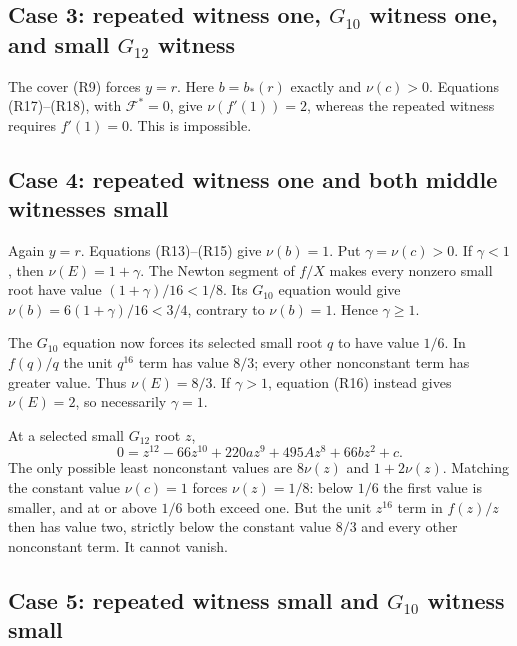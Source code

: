 \documentclass[
  british,
  10pt,
  a4paper,
]{article}
\begin{document}
\subsection{\texorpdfstring{Case 3: repeated witness one, \(G_{10}\)
witness one, and small \(G_{12}\)
witness}{Case 3: repeated witness one, G\_\{10\} witness one, and small G\_\{12\} witness}}\label{case-3-repeated-witness-one-g_10-witness-one-and-small-g_12-witness}

The cover (R9) forces \(y=r\). Here \(b=b_*(r)\) exactly and
\(\nu(c)>0\). Equations (R17)--(R18), with \(\mathcal F^*=0\), give
\(\nu(f'(1))=2\), whereas the repeated witness requires \(f'(1)=0\).
This is impossible.

\subsection{Case 4: repeated witness one and both middle witnesses
small}\label{case-4-repeated-witness-one-and-both-middle-witnesses-small}

Again \(y=r\). Equations (R13)--(R15) give \(\nu(b)=1\). Put
\(\gamma=\nu(c)>0\). If \(\gamma<1\), then \(\nu(E)=1+\gamma\). The
Newton segment of \(f/X\) makes every nonzero small root have value
\((1+\gamma)/16<1/8\). Its \(G_{10}\) equation would give
\(\nu(b)=6(1+\gamma)/16<3/4\), contrary to \(\nu(b)=1\). Hence
\(\gamma\geq1\).

The \(G_{10}\) equation now forces its selected small root \(q\) to have
value \(1/6\). In \(f(q)/q\) the unit \(q^{16}\) term has value \(8/3\);
every other nonconstant term has greater value. Thus \(\nu(E)=8/3\). If
\(\gamma>1\), equation (R16) instead gives \(\nu(E)=2\), so necessarily
\(\gamma=1\).

At a selected small \(G_{12}\) root \(z\), \[
0=z^{12}-66z^{10}+220az^9+495Az^8+66bz^2+c.                   \tag{R27}
\] The only possible least nonconstant values are \(8\nu(z)\) and
\(1+2\nu(z)\). Matching the constant value \(\nu(c)=1\) forces
\(\nu(z)=1/8\): below \(1/6\) the first value is smaller, and at or
above \(1/6\) both exceed one. But the unit \(z^{16}\) term in
\(f(z)/z\) then has value two, strictly below the constant value \(8/3\)
and every other nonconstant term. It cannot vanish.

\subsection{\texorpdfstring{Case 5: repeated witness small and
\(G_{10}\) witness
small}{Case 5: repeated witness small and G\_\{10\} witness small}}\label{case-5-repeated-witness-small-and-g_10-witness-small}
\end{document}
